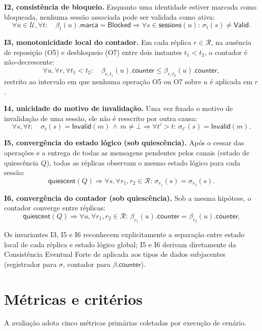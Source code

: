 \textbf{I2, consistência de bloqueio.} Enquanto uma identidade estiver marcada como bloqueada, nenhuma sessão associada pode ser validada como ativa:
\[
\forall u \in \mathcal{U}, \forall t: \quad \beta_t(u).\textsf{marca} = \textsf{Blocked} \Rightarrow \forall s \in \textsf{sessions}(u): \, \sigma_t(s) \ne \textsf{Valid}.
\]


\textbf{I3, monotonicidade local do contador.} Em cada réplica $r \in \mathcal{R}$, na ausência de reposição (O5) e desbloqueio (O7) entre dois instantes $t_1 < t_2$, o contador é não-decrescente:
\[
\forall u, \forall r, \forall t_1 < t_2: \quad \beta_{r, t_1}(u).\textsf{counter} \le \beta_{r, t_2}(u).\textsf{counter},
\]
restrito ao intervalo em que nenhuma operação O5 ou O7 sobre $u$ é aplicada em $r$.

\textbf{I4, unicidade do motivo de invalidação.} Uma vez fixado o motivo de invalidação de uma sessão, ele não é reescrito por outra causa:
\[
\forall s, \forall t: \quad \sigma_t(s) = \textsf{Invalid}(m) \, \land \, m \ne \bot \Rightarrow \forall t' > t: \, \sigma_{t'}(s) = \textsf{Invalid}(m).
\]

\textbf{I5, convergência do estado lógico (sob quiescência).} Após o cessar das operações e a entrega de todas as mensagens pendentes pelos canais (estado de quiescência $Q$), todas as réplicas observam o mesmo estado lógico para cada sessão:
\[
\textsf{quiescent}(Q) \Rightarrow \forall s, \forall r_1, r_2 \in \mathcal{R}: \, \sigma_{r_1}(s) = \sigma_{r_2}(s).
\]


\textbf{I6, convergência do contador (sob quiescência).} Sob a mesma hipótese, o contador converge entre réplicas:
\[
\textsf{quiescent}(Q) \Rightarrow \forall u, \forall r_1, r_2 \in \mathcal{R}: \, \beta_{r_1}(u).\textsf{counter} = \beta_{r_2}(u).\textsf{counter}.
\]


Os invariantes I3, I5 e I6 reconhecem explicitamente a separação entre estado local de cada réplica e estado lógico global; I5 e I6 derivam diretamente da Consistência Eventual Forte de \citet{shapiro_crdt_2011} aplicada aos tipos de dados subjacentes (registrador para $\sigma$, contador para $\beta.\textsf{counter}$). 

\section*{Métricas e critérios}
\label{sec-metricas}

A avaliação adota cinco métricas primárias coletadas por execução de cenário.

